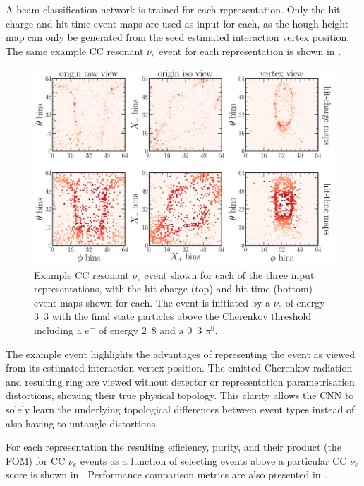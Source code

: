 A beam classification network is trained for each representation. Only the hit-charge and hit-time
event maps are used as input for each, as the hough-height map can only be generated from the seed
estimated interaction vertex position. The same example CC resonant $\nu_{e}$ event for each
representation is shown in .

\begin{figure} %
    \includegraphics[width=\textwidth]{diagrams/7-results/explore_repr_nuel_ccres_event.pdf}
    \caption[Example CC resonant $\nu_{e}$ event shown for different input representations]
    {Example CC resonant $\nu_{e}$ event shown for each of the three input representations, with
        the hit-charge (top) and hit-time (bottom) event maps shown for each. The event is
        initiated by a $\nu_{e}$ of energy \unit{3.3}{\GeV} with the final state particles above
        the Cherenkov threshold including a $e^{-}$ of energy \unit{2.8}{\GeV} and a
        \unit{0.3}{\GeV} $\pi^{0}$.}
    \label{fig:explore_repr_nuel_ccres_event}
\end{figure}

The example event highlights the advantages of representing the event as viewed from its estimated
interaction vertex position. The emitted Cherenkov radiation and resulting ring are viewed without
detector or representation parametrisation distortions, showing their true physical topology. This
clarity allows the CNN to solely learn the underlying topological differences between event types
instead of also having to untangle distortions.

For each representation the resulting efficiency, purity, and their product (the FOM) for CC
$\nu_{e}$ events as a function of selecting events above a particular CC $\nu_{e}$ score is shown
in . Performance comparison metrics are also presented in
.

